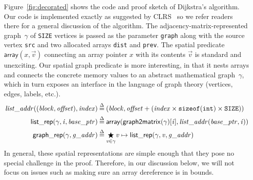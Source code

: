 

\vspace{-0.75em}

Figure~\ref{fig:decorated} shows the code and proof
sketch of Dijkstra's algorithm.  Our code is implemented exactly
as suggested by CLRS~\cite{clrs} so we refer readers there for a
general discussion of the algorithm.
The adjacency-matrix-represented graph~$\gamma$ of \texttt{SIZE} vertices
is passed as the parameter \texttt{graph} along with the source vertex \texttt{src}
and two allocated arrays \texttt{dist} and \texttt{prev}.
The spatial predicate $\mathsf{array}(x,\vec{v})$ connecting an array pointer $x$ with its contents $\vec{v}$ is standard and unexciting.
Our spatial graph predicate is more interesting, in
that it nests arrays and connects the concrete memory values to an abstract mathematical
graph~$\gamma$, which in turn exposes an interface in the language of graph theory
(vertices, edges, labels, etc.).
\vspace{-0.5em}
\begin{equation*}
\begin{split}
\m{list\_addr} ((\m{block}, \m{offset}), \m{index}) &\defeq
  (\m{block}, \m{offset} + (\m{index} \times \texttt{sizeof}(\texttt{int}) \times \texttt{SIZE})) \\
\p{list\_rep}(\gamma, \m{i}, \m{base\_ptr}) &\defeq \mathsf{array}(\mathsf{graph2matrix}(\gamma)[\m{i}], \m{list\_addr}(\m{base\_ptr}, \m{i})) \\
\vspace{1em}
\p{graph\_rep}(\gamma, \m{g\_addr}) &\defeq \underset{\m{v} \in \gamma}{\bigstar} \m{v}  \mapsto\p{list\_rep}(\gamma, \m{v}, \m{g\_addr})
\end{split}
\end{equation*}
In general, these spatial representations are simple enough that they pose no special
challenge in the proof. Therefore, in our discussion below, we will not focus on 
issues such as making sure an array dereference is in bounds.


